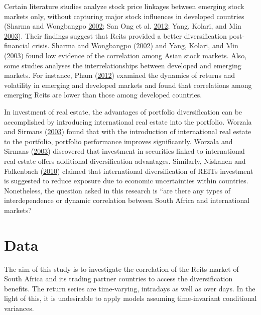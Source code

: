 \documentclass[11pt,preprint, authoryear]{elsarticle}
\numberwithin{equation}{section}
\numberwithin{figure}{section}
\numberwithin{table}{section}
\begin{document}
Certain literature studies analyze stock price linkages between emerging
stock markets only, without capturing major stock influences in
developed countries (Sharma and Wongbangpo
\protect\hyperlink{ref-sharma2002long}{2002}; San Ong et al.
\protect\hyperlink{ref-san2012malaysian}{2012}; Yang, Kolari, and Min
\protect\hyperlink{ref-yang2003stock}{2003}). Their findings suggest
that Reits provided a better diversification post-financial crisis.
Sharma and Wongbangpo (\protect\hyperlink{ref-sharma2002long}{2002}) and
Yang, Kolari, and Min (\protect\hyperlink{ref-yang2003stock}{2003})
found low evidence of the correlation among Asian stock markets. Also,
some studies analyses the interrelationships between developed and
emerging markets. For instance, Pham
(\protect\hyperlink{ref-pham2012dynamics}{2012}) examined the dynamics
of returns and volatility in emerging and developed markets and found
that correlations among emerging Reits are lower than those among
developed countries.

In investment of real estate, the advantages of portfolio
diversification can be accomplished by introducing international real
estate into the portfolio. Worzala and Sirmans
(\protect\hyperlink{ref-worzala2003investing}{2003}) found that with the
introduction of international real estate to the portfolio, portfolio
performance improves significantly. Worzala and Sirmans
(\protect\hyperlink{ref-worzala2003investing}{2003}) discovered that
investment in securities linked to international real estate offers
additional diversification advantages. Similarly, Niskanen and
Falkenbach (\protect\hyperlink{ref-niskanen2010reits}{2010}) claimed
that international diversification of REITs investment is suggested to
reduce exposure due to economic uncertainties within countries.
Nonetheless, the question asked in this research is ``are there any
types of interdependence or dynamic correlation between South Africa and
international markets?

\hypertarget{data}{%
\section{\texorpdfstring{Data \label{Data}}{Data }}\label{data}}

The aim of this study is to investigate the correlation of the Reits
market of South Africa and its trading partner countries to access the
diversification benefits. The return series are time-varying, intradays
as well as over days. In the light of this, it is undesirable to apply
models assuming time-invariant conditional variances.
\end{document}

